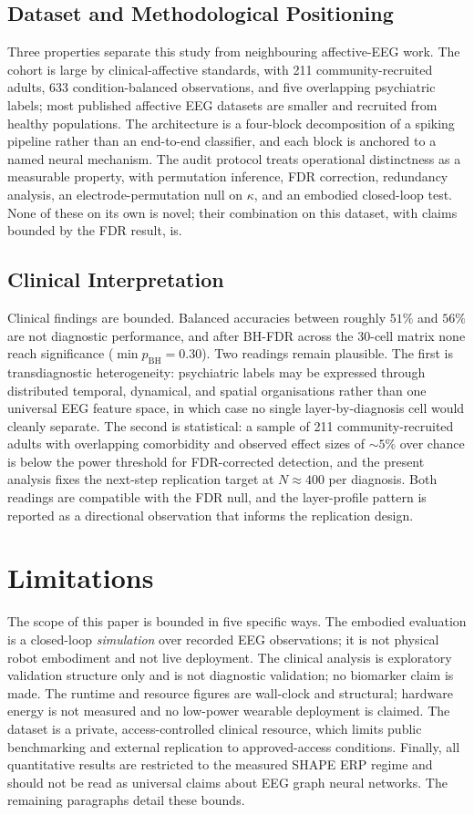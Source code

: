 \documentclass[journal]{IEEEtran}
\begin{document}
\subsection{Dataset and Methodological Positioning}\label{sec:novelty}
Three properties separate this study from neighbouring affective-EEG work. The cohort is large by clinical-affective standards, with 211 community-recruited adults, 633 condition-balanced observations, and five overlapping psychiatric labels; most published affective EEG datasets are smaller and recruited from healthy populations. The architecture is a four-block decomposition of a spiking pipeline rather than an end-to-end classifier, and each block is anchored to a named neural mechanism. The audit protocol treats operational distinctness as a measurable property, with permutation inference, FDR correction, redundancy analysis, an electrode-permutation null on $\kappa$, and an embodied closed-loop test. None of these on its own is novel; their combination on this dataset, with claims bounded by the FDR result, is.

\subsection{Clinical Interpretation}
Clinical findings are bounded. Balanced accuracies between roughly $51\%$ and $56\%$ are not diagnostic performance, and after BH-FDR across the 30-cell matrix none reach significance ($\min p_{\mathrm{BH}}=0.30$). Two readings remain plausible. The first is transdiagnostic heterogeneity: psychiatric labels may be expressed through distributed temporal, dynamical, and spatial organisations rather than one universal EEG feature space, in which case no single layer-by-diagnosis cell would cleanly separate. The second is statistical: a sample of 211 community-recruited adults with overlapping comorbidity and observed effect sizes of $\sim 5\%$ over chance is below the power threshold for FDR-corrected detection, and the present analysis fixes the next-step replication target at $N\approx 400$ per diagnosis. Both readings are compatible with the FDR null, and the layer-profile pattern is reported as a directional observation that informs the replication design.

\section{Limitations}
The scope of this paper is bounded in five specific ways. The embodied evaluation is a closed-loop \emph{simulation} over recorded EEG observations; it is not physical robot embodiment and not live deployment. The clinical analysis is exploratory validation structure only and is not diagnostic validation; no biomarker claim is made. The runtime and resource figures are wall-clock and structural; hardware energy is not measured and no low-power wearable deployment is claimed. The dataset is a private, access-controlled clinical resource, which limits public benchmarking and external replication to approved-access conditions. Finally, all quantitative results are restricted to the measured SHAPE ERP regime and should not be read as universal claims about EEG graph neural networks. The remaining paragraphs detail these bounds.
\end{document}
